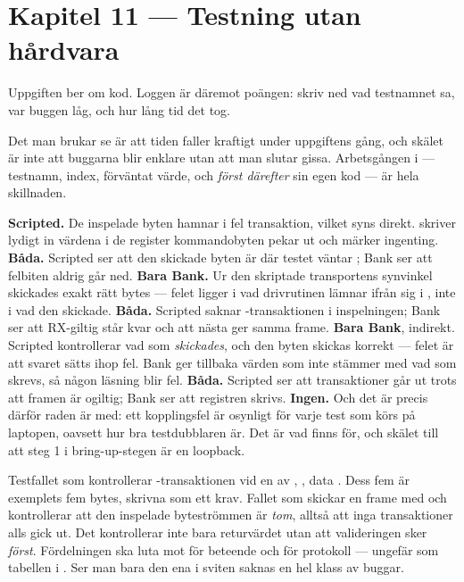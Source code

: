 \section*{Kapitel 11 --- Testning utan hårdvara}

Uppgiften ber om kod. Loggen är däremot poängen: skriv ned vad testnamnet sa, var buggen låg, och
hur lång tid det tog.

Det man brukar se är att tiden faller kraftigt under uppgiftens gång, och skälet är inte att
buggarna blir enklare utan att man slutar gissa. Arbetsgången i  --- testnamn,
index, förväntat värde, och \emph{först därefter} sin egen kod --- är hela skillnaden.

 \textbf{Scripted.} De inspelade byten hamnar i fel transaktion, vilket syns direkt.
 skriver lydigt in värdena i de register kommandobyten pekar ut och märker
ingenting.
 \textbf{Båda.} Scripted ser att den skickade byten är  där testet väntar
; Bank ser att felbiten aldrig går ned.
 \textbf{Bara Bank.} Ur den skriptade transportens synvinkel skickades exakt rätt bytes ---
felet ligger i vad drivrutinen lämnar ifrån sig i , inte i vad den skickade.
 \textbf{Båda.} Scripted saknar -transaktionen i inspelningen; Bank ser att
RX-giltig står kvar och att nästa  ger samma frame.
 \textbf{Bara Bank}, indirekt. Scripted kontrollerar vad som \emph{skickades}, och den
byten skickas korrekt --- felet är att svaret sätts ihop fel. Bank ger tillbaka värden som inte
stämmer med vad som skrevs, så någon läsning blir fel.
 \textbf{Båda.} Scripted ser att transaktioner går ut trots att framen är ogiltig; Bank ser
att registren skrivs.
 \textbf{Ingen.} Och det är precis därför raden är med: ett kopplingsfel är osynligt för
varje test som körs på laptopen, oavsett hur bra testdubblaren är. Det är vad
 finns för, och skälet till att steg 1 i bring-up-stegen är en loopback.

 Testfallet som kontrollerar -transaktionen vid en  av
, , data . Dess fem  är exemplets fem
bytes, skrivna som ett krav.
 Fallet som skickar en frame med  och kontrollerar att den inspelade
byteströmmen är \emph{tom}, alltså att inga transaktioner alls gick ut. Det kontrollerar inte bara
returvärdet utan att valideringen sker \emph{först}.
 Fördelningen ska luta mot  för beteende och 
för protokoll --- ungefär som tabellen i . Ser man bara den ena i sviten
saknas en hel klass av buggar.

